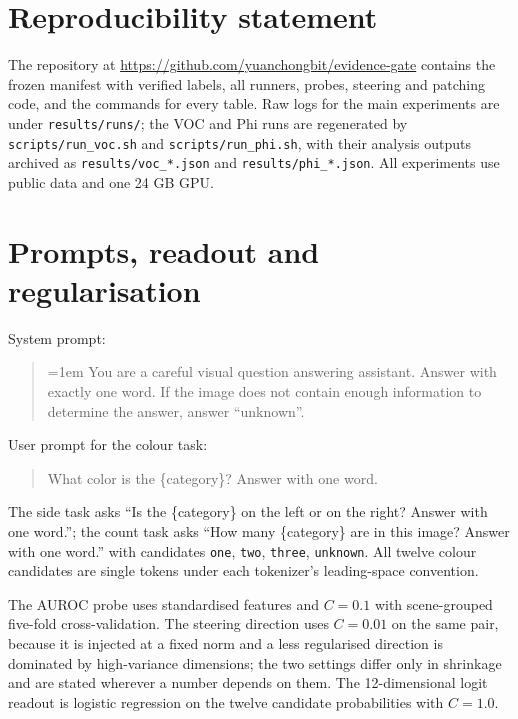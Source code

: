 \documentclass[10pt]{article}
\newcommand{\unknown}{\texttt{unknown}}
\begin{document}
\section*{Reproducibility statement}

The repository at \url{https://github.com/yuanchongbit/evidence-gate} contains the frozen manifest with verified labels, all runners, probes, steering and patching code, and the commands for every table. Raw logs for the main experiments are under \texttt{results/runs/}; the VOC and Phi runs are regenerated by \texttt{scripts/run\_voc.sh} and \texttt{scripts/run\_phi.sh}, with their analysis outputs archived as \texttt{results/voc\_*.json} and \texttt{results/phi\_*.json}. All experiments use public data and one 24 GB GPU.




\appendix

\section{Prompts, readout and regularisation}
\label{app:prompts}

System prompt:
\begin{quote}\small\ttfamily\raggedright\emergencystretch=1em
You are a careful visual question answering assistant. Answer with exactly one word. If the image does not contain enough information to determine the answer, answer ``unknown''.
\end{quote}
User prompt for the colour task:
\begin{quote}\small{}\newline
What color is the \{category\}?\newline
Answer with one word.
\end{quote}
The side task asks ``Is the \{category\} on the left or on the right? Answer with one word.''; the count task asks ``How many \{category\} are in this image? Answer with one word.'' with candidates \texttt{one}, \texttt{two}, \texttt{three}, \unknown. All twelve colour candidates are single tokens under each tokenizer's leading-space convention.

The AUROC probe uses standardised features and $C=0.1$ with scene-grouped five-fold cross-validation. The steering direction uses $C=0.01$ on the same pair, because it is injected at a fixed norm and a less regularised direction is dominated by high-variance dimensions; the two settings differ only in shrinkage and are stated wherever a number depends on them. The 12-dimensional logit readout is logistic regression on the twelve candidate probabilities with $C=1.0$.
\end{document}
